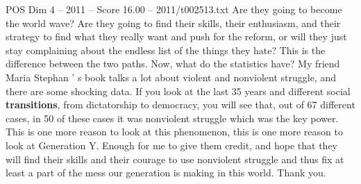\begin{textsample}{POS Dim 4 – 2011 – Score 16.00 – 2011/t002513.txt}
Are they going to become the world wave?
Are they going to find their skills, their enthusiasm, and their strategy to find what they really want and push for the reform, or will they just stay complaining about the endless list of the things they hate?
This is the difference between the two paths.
Now, what do the statistics have?
My friend Maria Stephan ' s book talks a lot about violent and nonviolent struggle, and there are some shocking data.
If you look at the last 35 years and different social \textbf{transitions}, from dictatorship to democracy, you will see that, out of 67 different cases, in 50 of these cases it was nonviolent struggle which was the key power.
This is one more reason to look at this phenomenon, this is one more reason to look at Generation Y.
Enough for me to give them credit, and hope that they will find their skills and their courage to use nonviolent struggle and thus fix at least a part of the mess our generation is making in this world.
Thank you.

\end{textsample}
